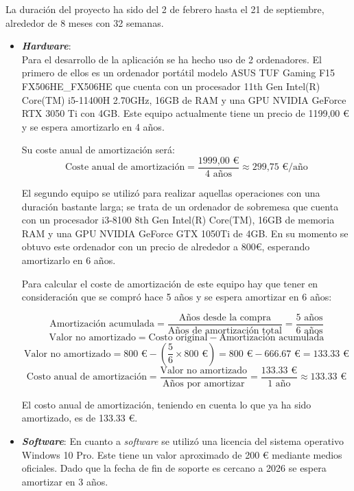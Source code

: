 La duración del proyecto ha sido del 2 de febrero hasta el 21 de septiembre, alrededor de 8 meses con 32 semanas. 

\begin{itemize}
	\item \textbf{\textit{Hardware}}:\\ Para el desarrollo de la aplicación se ha hecho uso de 2 ordenadores. El primero de ellos es un ordenador portátil modelo ASUS TUF Gaming F15 FX506HE\_FX506HE que cuenta con un procesador 11th Gen Intel(R) Core(TM) i5-11400H 2.70GHz, 16GB de RAM y una GPU NVIDIA GeForce RTX 3050 Ti con 4GB. Este equipo actualmente tiene un precio de 1199,00 € y se espera amortizarlo en 4 años.
	
	Su coste anual de amortización será:
	\[
	\text{Coste anual de amortización} = \frac{\text{1999,00 €}}{\text{4 años}} \approx \text{299,75 €/año}
	\]
	
	 El segundo equipo se utilizó para realizar aquellas operaciones con una duración bastante larga; se trata de un ordenador de sobremesa que cuenta con un procesador i3-8100 8th Gen Intel(R) Core(TM), 16GB de memoria RAM y una GPU NVIDIA GeForce GTX 1050Ti de 4GB. En su momento se obtuvo este ordenador con un precio de alrededor a 800€, esperando amortizarlo en 6 años.
	
	Para calcular el coste de amortización de este equipo hay que tener en consideración que se compró hace 5 años y se espera amortizar en 6 años:
	

\[
\text{Amortización acumulada} = \frac{\text{Años desde la compra}}{\text{Años de amortización total}} = \frac{5 \text{ años}}{6 \text{ años}}
\]
\[
\text{Valor no amortizado} = \text{Costo original} - \text{Amortización acumulada}
\]
\[
\text{Valor no amortizado} = 800 \text{ €} - \left(\frac{5}{6} \times 800 \text{ €}\right) = 800 \text{ €} - 666.67 \text{ €} = 133.33 \text{ €}
\]
\[
\text{Costo anual de amortización} = \frac{\text{Valor no amortizado}}{\text{Años por amortizar}} = \frac{133.33 \text{ €}}{1 \text{ año}} \approx 133.33 \text{ €}
\]

El costo anual de amortización, teniendo en cuenta lo que ya ha sido amortizado, es de 133.33 €.

\item \textbf{\textit{Software}}:
En cuanto a \textit{software} se utilizó una licencia del sistema operativo Windows 10 Pro. Este tiene un valor aproximado de 200 € mediante medios oficiales. Dado que la fecha de fin de soporte es cercano a 2026 se espera amortizar en 3 años.


\end{itemize}
